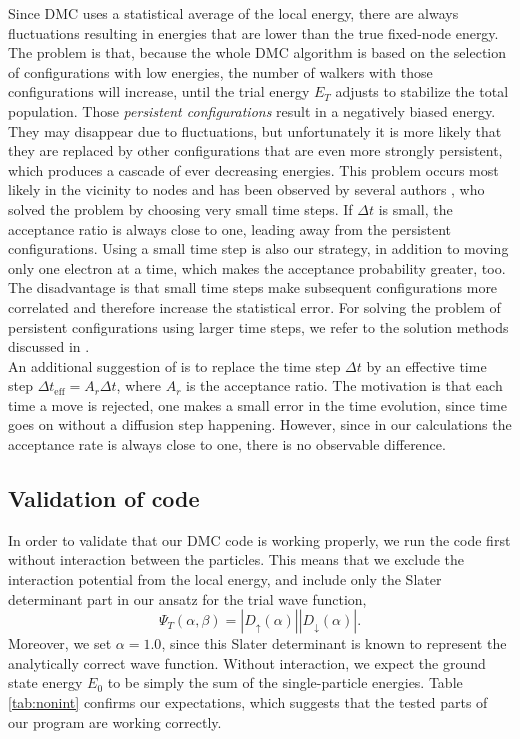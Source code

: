 Since DMC uses a statistical average of the local energy, there are always fluctuations resulting in energies that are lower than the true fixed-node energy. The problem is that, because the whole DMC algorithm is based on the selection of configurations with low energies, the number of walkers with those configurations will increase, until the trial energy $E_T$ adjusts to stabilize the total population. Those \textit{persistent configurations} result in a negatively biased energy. They may disappear due to fluctuations, but unfortunately it is more likely that they are replaced by other configurations that are even more strongly persistent, which produces a cascade of ever decreasing energies. This problem occurs most likely in the vicinity to nodes and has been observed by several authors \cite{persconf1, persconf2}, who solved the problem by choosing very small time steps. If $\Delta t$ is small, the acceptance ratio is always close to one, leading away from the persistent configurations. Using a small time step is also our strategy, in addition to moving only one electron at a time, which makes the acceptance probability greater, too. The disadvantage is that small time steps make subsequent configurations more correlated and therefore increase the statistical error. For solving the problem of persistent configurations using larger time steps, we refer to the solution methods discussed in \cite{PhysRev991}.\\
An additional suggestion of \cite{PhysRev991} is to replace the time step $\Delta t$ by an effective time step $\Delta t_{\text{eff}} = A_r \Delta t$, where $A_r$ is the acceptance ratio. The motivation is that each time a move is rejected, one makes a small error in the time evolution, since time goes on without a diffusion step happening. However, since in our calculations the acceptance rate is always close to one, there is no observable difference.

\subsection{Validation of code}
In order to validate that our DMC code is working properly, we run the code first without interaction between the particles. This means that we exclude the interaction potential from the local energy, and include only the Slater determinant part in our ansatz for the trial wave function,
\[
\Psi_T(\alpha, \beta ) = \left| D_{\uparrow}(\alpha)\right| \left| D_{\downarrow}(\alpha)\right|.
\]
Moreover, we set $\alpha=1.0$, since this Slater determinant is known to represent the analytically correct wave function. Without interaction, we expect the ground state energy $E_0$ to be simply the sum of the single-particle energies. Table \ref{tab:nonint} confirms our expectations, which suggests that the tested parts of our program are working correctly.

